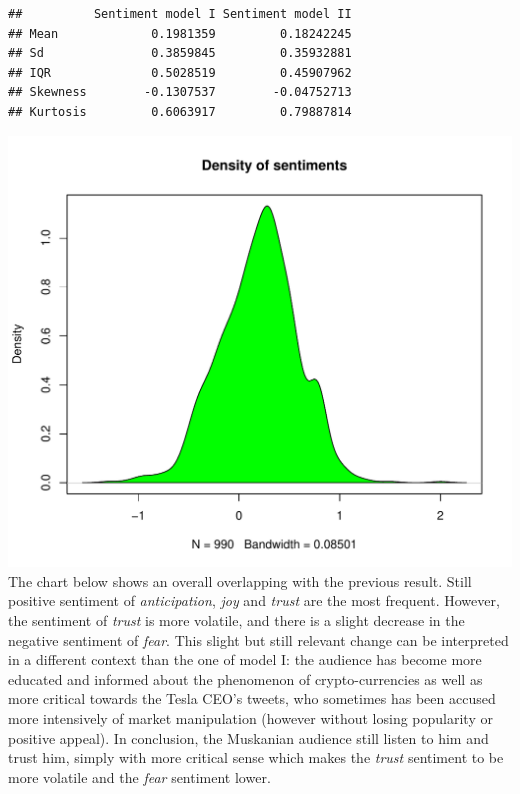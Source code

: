 \documentclass[
]{article}
\begin{document}
\begin{verbatim}
##          Sentiment model I Sentiment model II
## Mean             0.1981359         0.18242245
## Sd               0.3859845         0.35932881
## IQR              0.5028519         0.45907962
## Skewness        -0.1307537        -0.04752713
## Kurtosis         0.6063917         0.79887814
\end{verbatim}

\includegraphics{Trial1_files/figure-latex/fig12-1.pdf} The chart below
shows an overall overlapping with the previous result. Still positive
sentiment of \emph{anticipation}, \emph{joy} and \emph{trust} are the
most frequent. However, the sentiment of \emph{trust} is more volatile,
and there is a slight decrease in the negative sentiment of \emph{fear}.
This slight but still relevant change can be interpreted in a different
context than the one of model I: the audience has become more educated
and informed about the phenomenon of crypto-currencies as well as more
critical towards the Tesla CEO's tweets, who sometimes has been accused
more intensively of market manipulation (however without losing
popularity or positive appeal). In conclusion, the Muskanian audience
still listen to him and trust him, simply with more critical sense which
makes the \emph{trust} sentiment to be more volatile and the \emph{fear}
sentiment lower.
\end{document}
